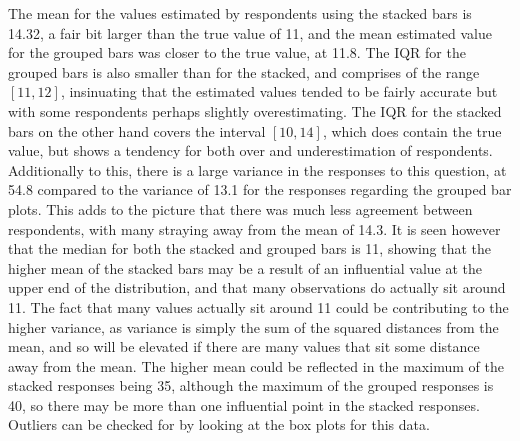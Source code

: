 \documentclass[
]{article}
\begin{document}
The mean for the values estimated by respondents using the stacked bars
is 14.32, a fair bit larger than the true value of 11, and the mean
estimated value for the grouped bars was closer to the true value, at
11.8. The IQR for the grouped bars is also smaller than for the stacked,
and comprises of the range \([11, 12]\), insinuating that the estimated
values tended to be fairly accurate but with some respondents perhaps
slightly overestimating. The IQR for the stacked bars on the other hand
covers the interval \([10, 14]\), which does contain the true value, but
shows a tendency for both over and underestimation of respondents.
Additionally to this, there is a large variance in the responses to this
question, at 54.8 compared to the variance of 13.1 for the responses
regarding the grouped bar plots. This adds to the picture that there was
much less agreement between respondents, with many straying away from
the mean of 14.3. It is seen however that the median for both the
stacked and grouped bars is 11, showing that the higher mean of the
stacked bars may be a result of an influential value at the upper end of
the distribution, and that many observations do actually sit around 11.
The fact that many values actually sit around 11 could be contributing
to the higher variance, as variance is simply the sum of the squared
distances from the mean, and so will be elevated if there are many
values that sit some distance away from the mean. The higher mean could
be reflected in the maximum of the stacked responses being 35, although
the maximum of the grouped responses is 40, so there may be more than
one influential point in the stacked responses. Outliers can be checked
for by looking at the box plots for this data.
\end{document}
